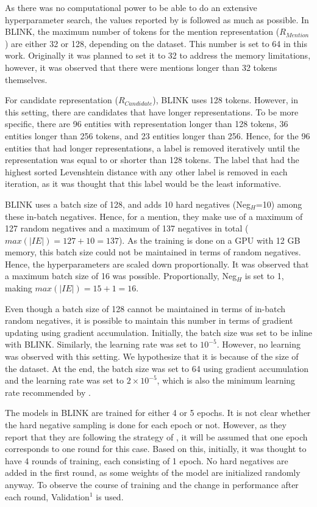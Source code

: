 \documentclass{report}
\theoremstyle{definition}
\theoremstyle{remark}
\begin{document}
As there was no computational power to be able to do an extensive hyperparameter search, the values reported by \cite{scalablezeroshot} is followed as much as possible. In BLINK, the maximum number of tokens for the mention representation ($R_{Mention}$) are either 32 or 128, depending on the dataset. This number is set to 64 in this work. Originally it was planned to set it to 32 to address the memory limitations, however, it was observed that there were mentions longer than 32 tokens themselves.

For candidate representation ($R_{Candidate}$), BLINK uses 128 tokens. However, in this setting, there are candidates that have longer representations. To be more specific, there are 96 entities with representation longer than 128 tokens, 36 entities longer than 256 tokens, and 23 entities longer than 256. Hence, for the 96 entities that had longer representations, a label is removed iteratively until the representation was equal to or shorter than 128 tokens. The label that had the highest sorted Levenshtein distance with any other label is removed in each iteration, as it was thought that this label would be the least informative.

BLINK uses a batch size of 128, and adds 10 hard negatives (Neg$_H$=10) among these in-batch negatives. Hence, for a mention, they make use of a maximum of 127 random negatives and a maximum of 137 negatives in total ($max(|IE|)=127+10=137$). As the training is done on a GPU with 12 GB memory, this batch size could not be maintained in terms of random negatives. Hence, the hyperparameters are scaled down proportionally. It was observed that a maximum batch size of 16 was possible. Proportionally, Neg$_H$ is set to 1, making $max(|IE|)=15+1=16$.

Even though a batch size of 128 cannot be maintained in terms of in-batch random negatives, it is possible to maintain this number in terms of gradient updating using gradient accumulation. Initially, the batch size was set to be inline with BLINK. Similarly, the learning rate was set to $10^{-5}$. However, no learning was observed with this setting. We hypothesize that it is because of the size of the dataset. At the end, the batch size was set to 64 using gradient accumulation and the learning rate was set to $2 \times 10^{-5}$, which is also the minimum learning rate recommended by \cite{BERT}.

The models in BLINK are trained for either 4 or 5 epochs. It is not clear whether the hard negative sampling is done for each epoch or not. However, as they report that they are following the strategy of \cite{googleintern}, it will be assumed that one epoch corresponds to one round for this case. Based on this, initially, it was thought to have 4 rounds of training, each consisting of 1 epoch. No hard negatives are added in the first round, as some weights of the model are initialized randomly anyway. To observe the course of training and the change in performance after each round, Validation$^1$ is used.
\end{document}
